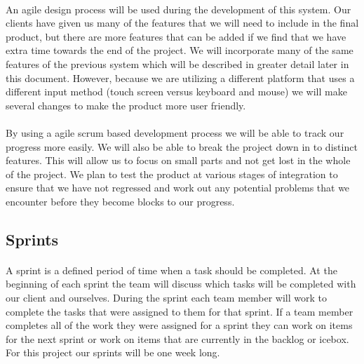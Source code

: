 \paragraph{} An agile design process will be used during the development of this system. Our clients have given us many of the features that we will need to include in the final product, but there are more features that can be added if we find that we have extra time towards the end of the project. We will incorporate many of the same features of the previous system which will be described in greater detail later in this document. However, because we are utilizing a different platform that uses a different input method (touch screen versus keyboard and mouse) we will make several changes to make the product more user friendly.

\paragraph{} By using a agile scrum based development process we will be able to track our progress more easily. We will also be able to break the project down in to distinct features. This will allow us to focus on small parts and not get lost in the whole of the project. We plan to test the product at various stages of integration to ensure that we have not regressed and work out any potential problems that we encounter before they become blocks to our progress.

\subsection{Sprints}
\paragraph{} A sprint is a defined period of time when a task should be completed. At the beginning of each sprint the team will discuss which tasks will be completed with our client and ourselves. During the sprint each team member will work to complete the tasks that were assigned to them for that sprint. If a team member completes all of the work they were assigned for a sprint they can work on items for the next sprint or work on items that are currently in the backlog or icebox. For this project our sprints will be one week long.